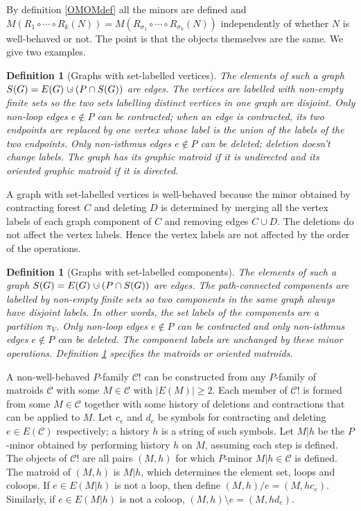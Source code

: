 \documentclass[12pt,leqno]{amsart}
\newtheorem{definition}[lem]{Definition}
\theoremstyle{remark}
\newcommand{\dunion}
{\mbox{\hbox{\hskip6pt$\cdot$\hskip-5.50pt$\cup$\hskip2pt}}}
\begin{document}
By definition \ref{OMOMdef} 
all the minors are defined and
$M(R_1\circ\cdots\circ R_k(N)) = M(R_{\sigma_1}\circ\cdots\circ R_{\sigma_k}(N))$
independently of whether $N$ is well-behaved or not.
The point is that the objects themselves are the same.
We give two examples.

\begin{definition}[Graphs with set-labelled vertices]
\label{GSLVDefinition}
The elements of such a graph $S(G)=E(G)\dunion(P\cap S(G))$ are edges.
The vertices are labelled with non-empty
finite sets so the two sets labelling distinct vertices in one
graph are disjoint.  Only non-loop edges $e\not\in P$
can be contracted; when an edge is contracted, its two endpoints
are replaced by one vertex whose label is the union of the 
labels of the two endpoints.  Only non-isthmus edges $e\not\in P$
can be deleted; deletion doesn't change labels.  The graph
has its graphic matroid if it is undirected and its
oriented graphic matroid if it is directed.
\end{definition}

A graph with set-labelled vertices is well-behaved because
the minor obtained  by contracting forest $C$
and deleting $D$ is determined by merging all the vertex labels
of each graph component of $C$ and removing edges $C\cup D$.  
The deletions do not affect the vertex labels.  Hence
the vertex labels are not affected by the order
of the operations.


\begin{definition}[Graphs with set-labelled components]
\label{GSLCDefinition}
The elements of such a graph $S(G)=E(G)\dunion(P\cap S(G))$ are edges.
The path-connected components are labelled by
non-empty finite sets so two components in the same
graph always have disjoint labels.  In other words,
the set labels of the components are a partition $\pi_V$.
Only non-loop edges $e\not\in P$
can be contracted and only non-isthmus edges 
$e\not\in P$
can be deleted.
The component labels are unchanged by these minor operations.
Definition \ref{GSLVDefinition} specifies the
matroids or oriented matroids.
\end{definition}


A non-well-behaved $P$-family $\mathcal{C}!$
can be constructed from
any $P$-family of matroids $\mathcal{C}$ with
some $M\in\mathcal{C}$ with $|E(M)|\geq 2$.  
Each member of $\mathcal{C}!$ is formed from
some $M\in\mathcal{C}$ together with some
history of deletions and contractions that
can be applied to $M$.  Let $c_e$ and $d_e$ be symbols
for contracting and deleting $e\in E(\mathcal{C})$
respectively; a history $h$ is a string of
such symbols.  
Let $M|h$ be the $P$-minor obtained by 
performing history $h$ on $M$, assuming each step
is defined.  The objects of $\mathcal{C}!$
are all pairs $(M,h)$ for which 
$P$-minor $M|h\in\mathcal{C}$ is defined.
The matroid of $(M,h)$ is $M|h$, which
determines the element set, loops and coloops.
If $e\in E(M|h)$ is not
a loop, then define $(M,h)/e=(M,hc_e)$.
Similarly, if $e\in E(M|h)$ is not
a coloop, $(M,h)\setminus e=(M,hd_e)$.
\end{document}
